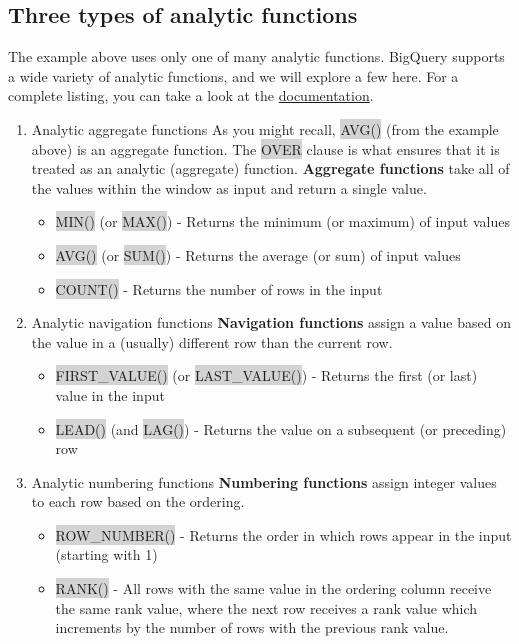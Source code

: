 \documentclass[11pt]{article}
\begin{document}
{{{{{{{{\subsection{Three types of analytic functions}
The example above uses only one of many analytic functions. BigQuery supports a wide variety of analytic functions, and we will explore a few here. For a complete listing, you can take a look at the \href{https://cloud.google.com/bigquery/docs/reference/standard-sql/analytic-function-concepts}{documentation}.
\begin{enumerate}[leftmargin = *]
\item Analytic aggregate functions
As you might recall, \colorbox{lightgray}{AVG()} (from the example above) is an aggregate function. The \colorbox{lightgray}{OVER} clause is what ensures that it is treated as an analytic (aggregate) function. \textbf{Aggregate functions} take all of the values within the window as input and return a single value.
\begin{itemize}
\item \colorbox{lightgray}{MIN()} (or \colorbox{lightgray}{MAX()}) - Returns the minimum (or maximum) of input values
\item \colorbox{lightgray}{AVG()} (or \colorbox{lightgray}{SUM()}) - Returns the average (or sum) of input values
\item \colorbox{lightgray}{COUNT()} - Returns the number of rows in the input
\end{itemize}
\item Analytic navigation functions
\textbf{Navigation functions} assign a value based on the value in a (usually) different row than the current row.
\begin{itemize}
\item \colorbox{lightgray}{FIRST\_VALUE()} (or \colorbox{lightgray}{LAST\_VALUE()}) - Returns the first (or last) value in the input
\item \colorbox{lightgray}{LEAD()} (and \colorbox{lightgray}{LAG()}) - Returns the value on a subsequent (or preceding) row
\end{itemize}
\item Analytic numbering functions
\textbf{Numbering functions} assign integer values to each row based on the ordering.
\begin{itemize}
\item \colorbox{lightgray}{ROW\_NUMBER()} - Returns the order in which rows appear in the input (starting with 1)
\item \colorbox{lightgray}{RANK()} - All rows with the same value in the ordering column receive the same rank value, where the next row receives a rank value which increments by the number of rows with the previous rank value.
\end{itemize}
\end{enumerate}

}}}}}}}}
\end{document}
